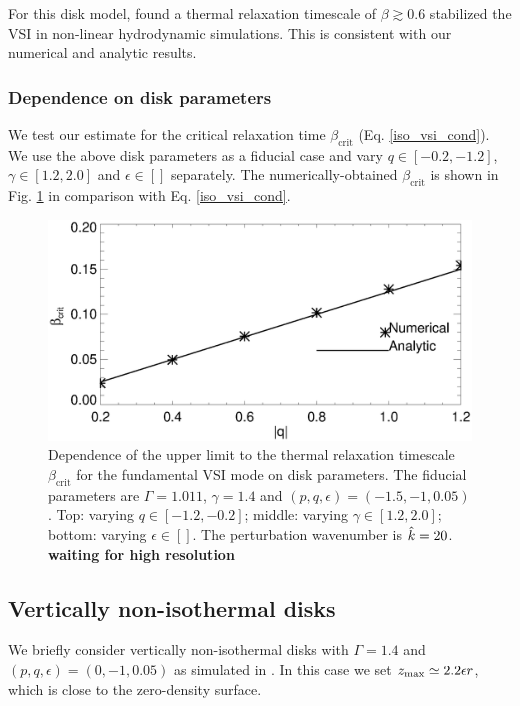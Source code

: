 For this disk model, \citeauthor{nelson13} found a thermal relaxation
timescale of $\beta\gtrsim 0.6$ stabilized the VSI in non-linear
hydrodynamic simulations. This is consistent with our numerical and
analytic results.    

\subsubsection{Dependence on disk parameters}
We test our estimate for the critical relaxation time
$\beta_\mathrm{crit}$ (Eq. \ref{iso_vsi_cond}). We use the above disk
parameters as a fiducial case and vary $q\in[-0.2,-1.2]$,
$\gamma\in[1.2,2.0]$ and $\epsilon\in[]$
separately. The numerically-obtained $\beta_\mathrm{crit}$ is shown in
Fig. \ref{bcrit_compare} in comparison with Eq. \ref{iso_vsi_cond}.  


\begin{figure}
  \includegraphics[width=\linewidth,clip=true,trim=0cm 0.0cm 0cm
  0cm]{figures/bcrit_compare_q.ps} 
  \caption{Dependence of the upper limit to the thermal relaxation timescale
    $\beta_\mathrm{crit}$ for the fundamental VSI mode on disk
    parameters. The fiducial parameters are $\Gamma=1.011$,
    $\gamma=1.4$ and $(p,q,\epsilon)=(-1.5,-1,0.05)$. Top: varying
    $q\in[-1.2,-0.2]$; middle: varying $\gamma\in[1.2,2.0]$; bottom:
    varying $\epsilon\in[]$. The perturbation wavenumber is
    $\hat{k}=20$. {\bf waiting for high resolution}
    \label{bcrit_compare}}  
\end{figure}


\subsection{Vertically non-isothermal disks}
We briefly consider vertically non-isothermal disks with
$\Gamma=1.4$ and $(p,q,\epsilon)=(0,-1,0.05)$ as simulated in
\cite{nelson13}. In this case we set $z_\mathrm{max}\simeq2.2\epsilon r$, which
is close to the zero-density surface.     

